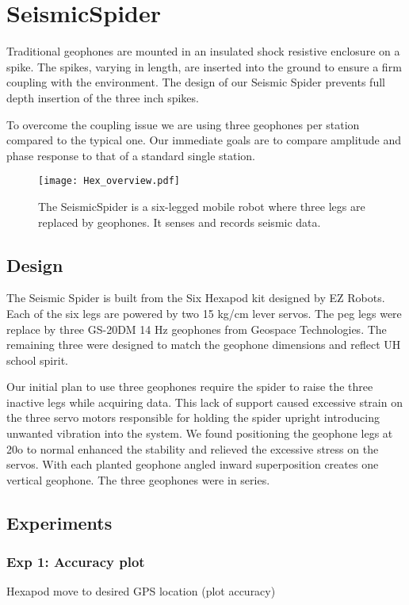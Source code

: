 \section{SeismicSpider}\label{sec:SeismicSpider}

Traditional geophones are mounted in an insulated shock resistive enclosure on a spike. The spikes, varying in length, are inserted into the ground to ensure a firm coupling with the environment. The design of our Seismic Spider prevents full depth insertion of the three inch spikes. 

	To overcome the coupling issue we are using three geophones per station compared to the typical one. Our immediate goals are to compare amplitude and phase response to that of a standard single station.	

\begin{figure} \centering
  {\texttt{[image: Hex\_overview.pdf]}}
 \caption{The SeismicSpider is a six-legged mobile robot where three legs are replaced by geophones. It senses and records seismic data.} 
 \label{fig:TradvsAutoDrop}
\end{figure}
\subsection{Design}

The Seismic Spider is built from the Six Hexapod kit designed by EZ Robots. Each of the six legs are powered by two 15 kg/cm lever servos. The peg legs were replace by three GS-20DM 14 Hz geophones from Geospace Technologies. The remaining three were designed to match the geophone dimensions and reflect UH school spirit.

 Our initial plan to use three geophones require the spider to raise the three inactive legs while acquiring data. This lack of support caused excessive strain on the three servo motors responsible for holding the spider upright introducing unwanted vibration into the system. We found positioning the geophone legs at 20o to normal enhanced the stability and relieved the excessive stress on the servos. With each planted geophone angled inward superposition creates one vertical geophone. The three geophones were in series.

\subsection{Experiments}
\subsubsection{Exp 1: Accuracy plot}
Hexapod move to desired GPS location  (plot accuracy)\\
